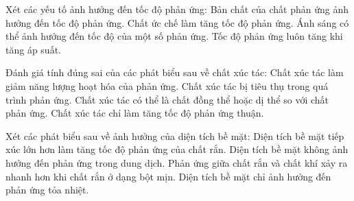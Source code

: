 \documentclass[Main.tex]{subfiles}
\begin{document}
\begin{ex}
	Xét các yếu tố ảnh hưởng đến tốc độ phản ứng:
	\choiceTF
	{\True Bản chất của chất phản ứng ảnh hưởng đến tốc độ phản ứng.}
	{Chất ức chế làm tăng tốc độ phản ứng.}
	{\True Ánh sáng có thể ảnh hưởng đến tốc độ của một số phản ứng.}
	{Tốc độ phản ứng luôn tăng khi tăng áp suất.}
\end{ex}
\begin{ex}
	Đánh giá tính đúng sai của các phát biểu sau về chất xúc tác:
	\choiceTF
	{\True Chất xúc tác làm giảm năng lượng hoạt hóa của phản ứng.}
	{Chất xúc tác bị tiêu thụ trong quá trình phản ứng.}
	{\True Chất xúc tác có thể là chất đồng thể hoặc dị thể so với chất phản ứng.}
	{Chất xúc tác chỉ làm tăng tốc độ phản ứng thuận.}
\end{ex}
\begin{ex}
	Xét các phát biểu sau về ảnh hưởng của diện tích bề mặt:
	\choiceTF
	{\True Diện tích bề mặt tiếp xúc lớn hơn làm tăng tốc độ phản ứng của chất rắn.}
	{Diện tích bề mặt không ảnh hưởng đến phản ứng trong dung dịch.}
	{\True Phản ứng giữa chất rắn và chất khí xảy ra nhanh hơn khi chất rắn ở dạng bột mịn.}
	{Diện tích bề mặt chỉ ảnh hưởng đến phản ứng tỏa nhiệt.}
\end{ex}
\end{document}
